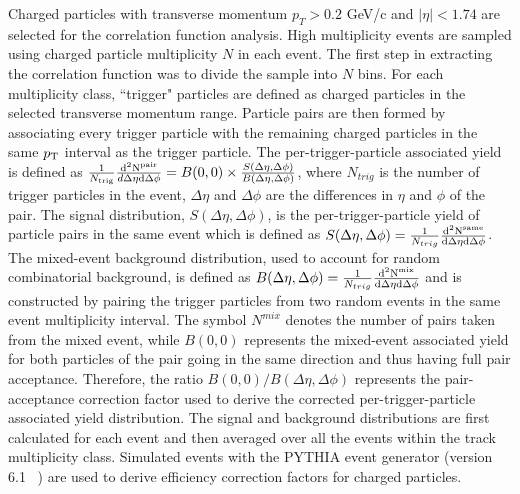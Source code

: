 \documentclass[aps,prl,twocolumn,showpacs,superscriptaddress,groupedaddress]{revtex4}  %
\begin{document}

Charged particles with transverse momentum $p_{T}>0.2$ GeV/c and $|\eta|<1.74$ are selected for the correlation function analysis. High multiplicity events are sampled using charged particle multiplicity $N$ in each event. The first step in extracting the correlation function was to divide the sample into $N$ bins. For each multiplicity class, ``trigger" particles are defined as charged particles in the selected transverse momentum range. Particle pairs are then formed by associating every trigger particle with the remaining charged particles in the same $p_{\rm T}$ interval as the trigger particle. The per-trigger-particle associated yield is defined as $\frac{1}{N_{\rm trig}}\frac{\rm d^2N^{pair}}{d\Delta\eta  \rm d\Delta\phi}= B(0,0) \times \frac{S(\Delta\eta, \Delta\phi)}{B(\Delta\eta, \Delta\phi)}$, where $N_{trig}$ is the number of trigger particles in the event, $\Delta\eta$ and $\Delta\phi$ are the differences in $\eta$ and $\phi$ of the pair. The signal distribution, $S(\Delta\eta, \Delta\phi)$, is the per-trigger-particle yield of particle pairs in the same event which is defined as $S(\Delta\eta,\Delta\phi) = \frac{1}{N_{trig}}\frac{\rm d^2 N^{\rm same}}{\rm d\Delta\eta \rm d\Delta\phi}$. The mixed-event background distribution, used to account for random combinatorial background, is defined as $B(\Delta\eta,\Delta\phi) = \frac{1}{N_{trig}}\frac{\rm d^2 N^{\rm mix}}{\rm d\Delta\eta \rm d\Delta\phi}$ and is constructed by pairing the trigger particles from two random events in the same event multiplicity interval.
The symbol $N^{mix}$ denotes the number of pairs taken from the mixed event, while $B(0,0)$ represents the mixed-event associated yield for both particles of the pair going in the same direction and thus having full pair acceptance. Therefore, 
the ratio $B(0,0)/B(\Delta\eta,\Delta\phi)$ represents the pair-acceptance correction factor used to derive the corrected per-trigger-particle
associated yield distribution.  The signal and background distributions are first calculated for each event and then averaged over all the events within the track multiplicity class. Simulated events with the PYTHIA event generator (version 6.1 ~\cite{Sjostrand:2000wi}) are used to derive efficiency correction factors for charged particles.
\end{document}
